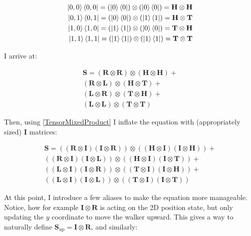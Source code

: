 \begin{align*} 
    \ket{0,0}\bra{0,0} = (\ket{0}\bra{0}) \otimes (\ket{0}\bra{0}) = \mathbf{H} \otimes \mathbf{H} \\
    \ket{0,1}\bra{0,1} = (\ket{0}\bra{0}) \otimes (\ket{1}\bra{1}) = \mathbf{H} \otimes \mathbf{T} \\
    \ket{1,0}\bra{1,0} = (\ket{1}\bra{1}) \otimes (\ket{0}\bra{0}) = \mathbf{T} \otimes \mathbf{H} \\
    \ket{1,1}\bra{1,1} = (\ket{1}\bra{1}) \otimes (\ket{1}\bra{1}) = \mathbf{T} \otimes \mathbf{T}
\end{align*}

I arrive at:

\begin{align*} 
    \mathbf{S} =   
    (\mathbf{R} \otimes \mathbf{R}) \otimes (\mathbf{H} \otimes \mathbf{H}) + \\
    (\mathbf{R} \otimes \mathbf{L}) \otimes (\mathbf{H} \otimes \mathbf{T}) + \\
    (\mathbf{L} \otimes \mathbf{R}) \otimes (\mathbf{T} \otimes \mathbf{H}) + \\
    (\mathbf{L} \otimes \mathbf{L}) \otimes (\mathbf{T} \otimes \mathbf{T})\phantom{+}
\end{align*}

Then, using \hyperref[TensorMixedProduct]{[TensorMixedProduct]} I inflate the equation with (appropriately sized) $\mathbf{I}$ matrices:

\begin{align*} 
    \mathbf{S} =   
    ((\mathbf{R} \otimes \mathbf{I})(\mathbf{I} \otimes \mathbf{R})) \otimes ((\mathbf{H} \otimes \mathbf{I}) (\mathbf{I} \otimes \mathbf{H})) + \\
    ((\mathbf{R} \otimes \mathbf{I})(\mathbf{I} \otimes \mathbf{L})) \otimes ((\mathbf{H} \otimes \mathbf{I}) (\mathbf{I} \otimes \mathbf{T})) + \\
    ((\mathbf{L} \otimes \mathbf{I})(\mathbf{I} \otimes \mathbf{R})) \otimes ((\mathbf{T} \otimes \mathbf{I}) (\mathbf{I} \otimes \mathbf{H})) + \\
    ((\mathbf{L} \otimes \mathbf{I})(\mathbf{I} \otimes \mathbf{L})) \otimes ((\mathbf{T} \otimes \mathbf{I}) (\mathbf{I} \otimes \mathbf{T}))\phantom{+}
\end{align*}

At this point, I introduce a few aliases to make the equation more manageable. Notice, how for example $\mathbf{I} \otimes \mathbf{R}$ is acting on the 2D position state, but only updating the $y$ coordinate to move the walker upward. This
gives a way to naturally define $\mathbf{S}_{\text{up}} = \mathbf{I} \otimes \mathbf{R}$, and similarly:

